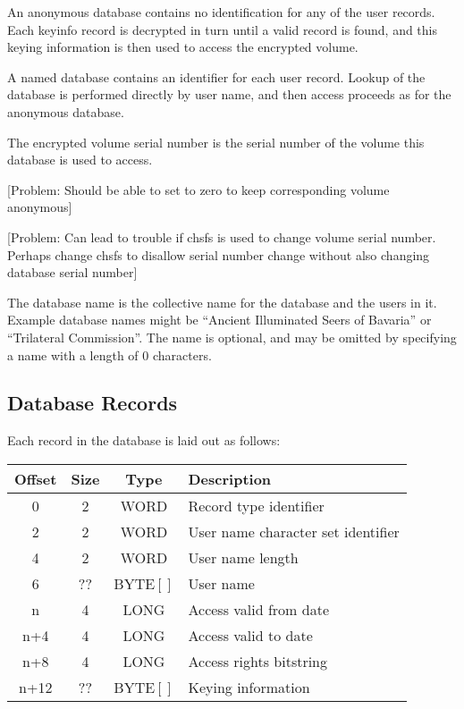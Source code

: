 An anonymous database contains no identification for any of the user records.
Each keyinfo record is decrypted in turn until a valid record is found, and
this keying information is then used to access the encrypted volume.

A named database contains an identifier for each user record.  Lookup of the
database is performed directly by user name, and then access proceeds as for
the anonymous database.

The encrypted volume serial number is the serial number of the volume this
database is used to access.

[Problem: Should be able to set to zero to keep corresponding volume anonymous]

[Problem: Can lead to trouble if chsfs is used to change volume serial number.
          Perhaps change chsfs to disallow serial number change without also
          changing database serial number]

The database name is the collective name for the database and the users in it.
Example database names might be ``Ancient Illuminated Seers of Bavaria'' or
``Trilateral Commission''.  The name is optional, and may be omitted by
specifying a name with a length of 0 characters.


\subsection{Database Records}

Each record in the database is laid out as follows:

\begin{center}
\begin{tabular}{|c|c|c|l|}
\hline
    Offset & Size &   Type    &    Description\\
\hline
       0   &   2  &   WORD    &    Record type identifier\\
       2   &   2  &   WORD    &    User name character set identifier\\
       4   &   2  &   WORD    &    User name length\\
       6   &  ??  &   BYTE$[ ]$  &    User name\\
       n   &   4  &   LONG    &    Access valid from date\\
     n+4   &   4  &   LONG    &    Access valid to date\\
     n+8   &   4  &   LONG    &    Access rights bitstring\\
    n+12   &  ??  &   BYTE$[ ]$  &    Keying information\\
\hline
\end{tabular}
\end{center}


